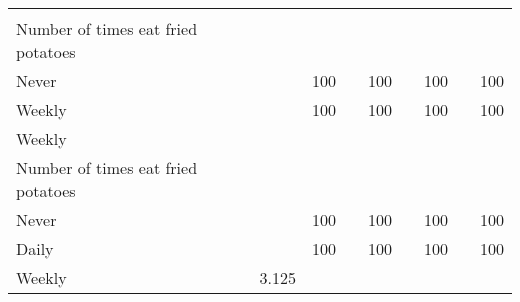 \documentclass{article}
\begin{document}
\begin{tabular}{lllllllll}
  \multicolumn{1}{r}{} &
  \multicolumn{1}{r}{} &
  \multicolumn{1}{r}{} &
  \multicolumn{1}{r}{} \\
\multicolumn{1}{l}{\hspace{6em}Number of times eat fried potatoes} &
  \multicolumn{1}{|r}{} &
  \multicolumn{1}{r}{} &
  \multicolumn{1}{r}{} &
  \multicolumn{1}{r}{} &
  \multicolumn{1}{r}{} &
  \multicolumn{1}{r}{} &
  \multicolumn{1}{r}{} &
  \multicolumn{1}{r}{} \\
\multicolumn{1}{l}{\hspace{7em}Never} &
  \multicolumn{1}{|r}{} &
  \multicolumn{1}{r}{100} &
  \multicolumn{1}{r}{} &
  \multicolumn{1}{r}{100} &
  \multicolumn{1}{r}{} &
  \multicolumn{1}{r}{100} &
  \multicolumn{1}{r}{} &
  \multicolumn{1}{r}{100} \\
\multicolumn{1}{l}{\hspace{7em}Weekly} &
  \multicolumn{1}{|r}{} &
  \multicolumn{1}{r}{100} &
  \multicolumn{1}{r}{} &
  \multicolumn{1}{r}{100} &
  \multicolumn{1}{r}{} &
  \multicolumn{1}{r}{100} &
  \multicolumn{1}{r}{} &
  \multicolumn{1}{r}{100} \\
\multicolumn{1}{l}{\hspace{5em}Weekly} &
  \multicolumn{1}{|r}{} &
  \multicolumn{1}{r}{} &
  \multicolumn{1}{r}{} &
  \multicolumn{1}{r}{} &
  \multicolumn{1}{r}{} &
  \multicolumn{1}{r}{} &
  \multicolumn{1}{r}{} &
  \multicolumn{1}{r}{} \\
\multicolumn{1}{l}{\hspace{6em}Number of times eat fried potatoes} &
  \multicolumn{1}{|r}{} &
  \multicolumn{1}{r}{} &
  \multicolumn{1}{r}{} &
  \multicolumn{1}{r}{} &
  \multicolumn{1}{r}{} &
  \multicolumn{1}{r}{} &
  \multicolumn{1}{r}{} &
  \multicolumn{1}{r}{} \\
\multicolumn{1}{l}{\hspace{7em}Never} &
  \multicolumn{1}{|r}{} &
  \multicolumn{1}{r}{100} &
  \multicolumn{1}{r}{} &
  \multicolumn{1}{r}{100} &
  \multicolumn{1}{r}{} &
  \multicolumn{1}{r}{100} &
  \multicolumn{1}{r}{} &
  \multicolumn{1}{r}{100} \\
\multicolumn{1}{l}{\hspace{7em}Daily} &
  \multicolumn{1}{|r}{} &
  \multicolumn{1}{r}{100} &
  \multicolumn{1}{r}{} &
  \multicolumn{1}{r}{100} &
  \multicolumn{1}{r}{} &
  \multicolumn{1}{r}{100} &
  \multicolumn{1}{r}{} &
  \multicolumn{1}{r}{100} \\
\multicolumn{1}{l}{\hspace{7em}Weekly} &
  \multicolumn{1}{|r}{3.125} &

\end{tabular}
\end{document}
